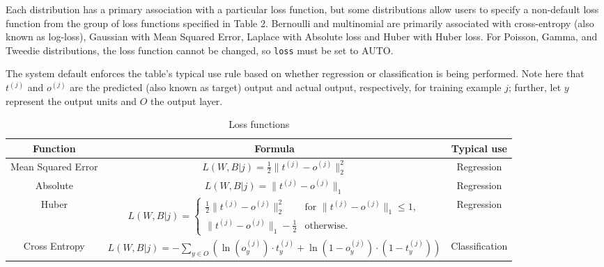 Each distribution has a primary association with a particular loss function, but some distributions allow users to specify a non-default loss function from the group of loss functions specified in Table 2.  Bernoulli and multinomial are primarily associated with cross-entropy (also known as log-loss), Gaussian with Mean Squared Error, Laplace with Absolute loss and Huber with Huber loss.  For Poisson, Gamma, and Tweedie distributions, the loss function cannot be changed, so \texttt{loss} must be set to AUTO.    


The system default enforces the table's typical use rule based on whether regression or classification is being performed. Note here that $t^{(j)}$ and $o^{(j)}$ are the predicted (also known as target) output and actual output, respectively, for training example $j$; further, let $y$ represent the output units and $O$ the output layer.

\begin{table}[ht] 
\caption{Loss functions }
\centering %
\begin{adjustbox}{width=\textwidth} %
\begin{tabular}{c c c} %
\hline\hline %
Function & Formula & Typical use \\ [0.5ex] %
\hline %
Mean Squared Error & $L(W,B | j) = \frac{1}{2}\|t^{(j)} - o^{(j)}\|_2^2$ & Regression \\ %
Absolute & $L(W,B | j) =  \|t^{(j)} - o^{(j)}\|_1$ & Regression \\
Huber & $L(W,B | j) = \begin{cases} \frac{1}{2}\|t^{(j)} - o^{(j)}\|_2^2 & \textrm{for } \|t^{(j)} - o^{(j)}\|_1 \le 1, \\  \|t^{(j)} - o^{(j)}\|_1- \frac{1}{2} & \textrm{otherwise.}\end{cases}$ & Regression \\
Cross Entropy & $L(W,B | j) = -\sum\limits_{y \in O} \left(\ln(o_y^{(j)}) \cdot t_y^{(j)} + \ln(1-o_y^{(j)}) \cdot (1-t_y^{(j)})\right) $ & Classification \\
\hline %
\end{tabular} 
\end{adjustbox}
\label{table:LossFunctions} %
\end{table}

